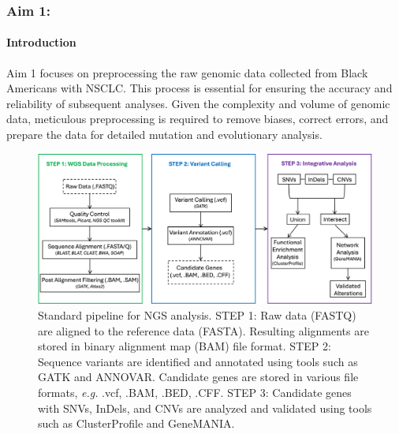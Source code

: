 

\subsubsection{Aim 1: \SpecificAimOne}

\paragraph{Introduction}

Aim 1 focuses on preprocessing the raw genomic data collected from Black Americans with NSCLC. 
This process is essential for ensuring the accuracy and reliability of subsequent analyses. 
Given the complexity and volume of genomic data, meticulous preprocessing is required to remove biases, correct errors, 
and prepare the data for detailed mutation and evolutionary analysis. 

\begin{figure}[h] %
  \centering
  \begin{mdframed}
  \includegraphics[width=7.4in]{./Figures/data-processing.png}
  \caption{Standard pipeline for NGS analysis.
  STEP 1: Raw data (FASTQ) are aligned to the reference data (FASTA). Resulting alignments are stored in binary alignment map (BAM) file format. 
  STEP 2: Sequence variants are identified and annotated using tools such as GATK and ANNOVAR. Candidate genes are stored in various file formats, \textit{e.g.} .vcf, .BAM, .BED, .CFF.
  STEP 3: Candidate genes with SNVs, InDels, and CNVs are analyzed and validated using tools such as ClusterProfile and GeneMANIA.
  }
  \label{data-processing}
  \end{mdframed}
\end{figure}

